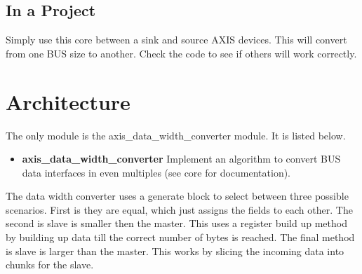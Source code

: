 

\subsection{In a Project}
\par
Simply use this core between a sink and source AXIS devices. This will convert from one BUS size to another. Check the code to see if others will work correctly.

\section{Architecture}
\par
The only module is the axis\_data\_width\_converter module. It is listed below.

\begin{itemize}
  \item \textbf{axis\_data\_width\_converter } Implement an algorithm to convert BUS data interfaces in even multiples (see core for documentation).
\end{itemize}

\par
The data width converter uses a generate block to select between three possible scenarios. First is they are equal, which just assigns the fields to each other.
The second is slave is smaller then the master. This uses a register build up method by building up data till the correct number of bytes is reached. The final
method is slave is larger than the master. This works by slicing the incoming data into chunks for the slave.

